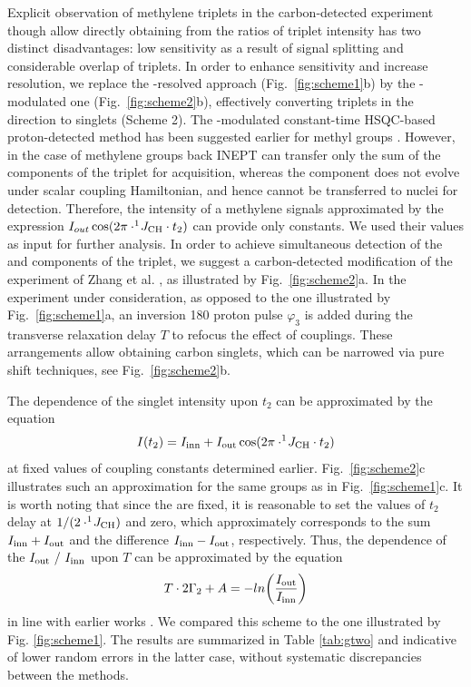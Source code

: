 \documentclass[twocolumn]{svjour3}           %
\begin{document}
Explicit observation of methylene triplets in the carbon-detected experiment 
though allow directly obtaining \gtwo{} from the ratios of triplet intensity 
has two distinct disadvantages: low sensitivity as a result of signal splitting and considerable overlap of triplets. 
In order to enhance sensitivity and increase resolution, we replace the 
\oneJch-resolved approach (Fig.~\ref{fig:scheme1}b) by the \oneJch-modulated 
one (Fig.~\ref{fig:scheme2}b), 
effectively converting triplets in the \clab{} direction to singlets 
(Scheme 2). The \oneJch-modulated constant-time {HSQC}-based proton-detected 
method has been sugges\-ted earlier for methyl groups \cite{zhang_probing_2006,lesovoy_nmr_2017}.
However, in the case of methylene groups back {INEPT} can transfer only the 
sum of the \qouter{} components \TermOuter{} of the \clab{} triplet for 
\hlab{} acquisition, whereas the \qinner{} component \TermInner{} does not 
evolve under \oneJch{} scalar coupling Hamiltonian, and hence cannot be 
transferred to \hlab{} nuclei for detection. Therefore, the intensity of a methylene signals approximated by the expression $I_{out} \cos (2 \pi \cdot ^1\!J_\text{CH} \cdot t_2) $ can provide only \oneJch{} constants. We used their values as input for 
further analysis. In order to achieve simultaneous detection of the 
\qinner{} and \qouter{} components of the \clab{} triplet, we suggest a 
carbon-detected modification of the experiment of Zhang et al. 
\cite{zhang_probing_2006}, as illustrated by Fig.~\ref{fig:scheme2}a. 
In the experiment under consideration, as opposed to the one illustrated 
by Fig.~\ref{fig:scheme1}a, an inversion 180\degree{} proton pulse 
$\varphi_3$ is added during the transverse relaxation delay $T$ to 
refocus the effect of \oneJch{} couplings. These arrangements allow 
obtaining carbon singlets, which can be narrowed via pure 
shift techniques, see Fig.~\ref{fig:scheme2}b. 

The dependence of the singlet intensity upon $t_2$ can be approximated by the 
equation
\begin{equation}
  \label{eq:sch2:time}
  I(t_2) = I_\textrm{inn} + I_\textrm{out} \cos (2\pi \cdot ^1\!J_\text{CH} \cdot t_2 ) 
\end{equation}
at fixed values of \oneJch{} coupling constants determined earlier. 
Fig.~\ref{fig:scheme2}c illustrates such an approximation for the same 
groups as in Fig.~\ref{fig:scheme1}c. 
It is worth noting that since the \oneJch{} are fixed, it is reasonable to 
set the values of $t_2$ delay at $1/(2 \cdot ^1\!J_\text{CH})$ and zero, which approximately 
corresponds to the sum $I_\textrm{inn} + I_\textrm{out}$ and the difference 
$I_\textrm{inn} - I_\textrm{out}$, respectively. Thus, the dependence of the $\Iout / \Iinn$ 
upon $T$ can be approximated by the equation 
\begin{equation}
  \label{eq:sch2:intensity}
  T \cdot 2 \Gamma_2 + A = -ln \biggl(\frac{I_\textrm{out}}{I_\textrm{inn}} \biggr) 
\end{equation}
in line with earlier works \cite{carlomagno_errors_2000,zhang_probing_2006}. 
We compared this scheme to the one illustrated by Fig. \ref{fig:scheme1}. 
The results are 
summarized in Table \ref{tab:gtwo} and indicative of lower random errors 
in the latter case, without systematic discrepancies between the methods. 
\end{document}
